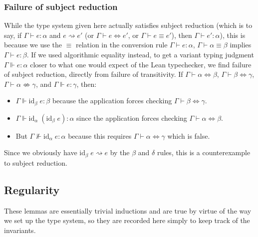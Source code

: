 \subsubsection{Failure of subject reduction}
While the type system given here actually satisfies subject reduction (which is to say, if $\Gamma\vdash e:\alpha$ and $e\rightsquigarrow e'$ (or $\Gamma\vdash e\Leftrightarrow e'$, or $\Gamma\vdash e\equiv e'$), then $\Gamma\vdash e':\alpha$), this is because we use the $\equiv$ relation in the conversion rule $\Gamma\vdash e:\alpha$, $\Gamma\vdash \alpha\equiv\beta$ implies $\Gamma\vdash e:\beta$. If we used algorithmic equality instead, to get a variant typing judgment $\Gamma\Vdash e:\alpha$ closer to what one would expect of the Lean typechecker, we find failure of subject reduction, directly from failure of transitivity. If $\Gamma\vdash\alpha\Leftrightarrow\beta$, $\Gamma\vdash\beta\Leftrightarrow\gamma$, $\Gamma\vdash\alpha\not\Leftrightarrow\gamma$, and $\Gamma\Vdash e:\gamma$, then:
\begin{itemize}
\item $\Gamma\Vdash \mbox{id}_\beta\;e:\beta$ because the application forces checking $\Gamma\vdash\beta\Leftrightarrow\gamma$.
\item $\Gamma\Vdash \mbox{id}_\alpha\;(\mbox{id}_\beta\;e):\alpha$ since the application forces checking $\Gamma\vdash\alpha\Leftrightarrow\beta$.
\item But $\Gamma\not\Vdash \mbox{id}_\alpha\;e:\alpha$ because this requires $\Gamma\vdash\alpha\Leftrightarrow\gamma$ which is false.
\end{itemize}
Since we obviously have $\mbox{id}_\beta\;e\rightsquigarrow e$ by the $\beta$ and $\delta$ rules, this is a counterexample to subject reduction.
\subsection{Regularity}
These lemmas are essentially trivial inductions and are true by virtue of the way we set up the type system, so they are recorded here simply to keep track of the invariants.

